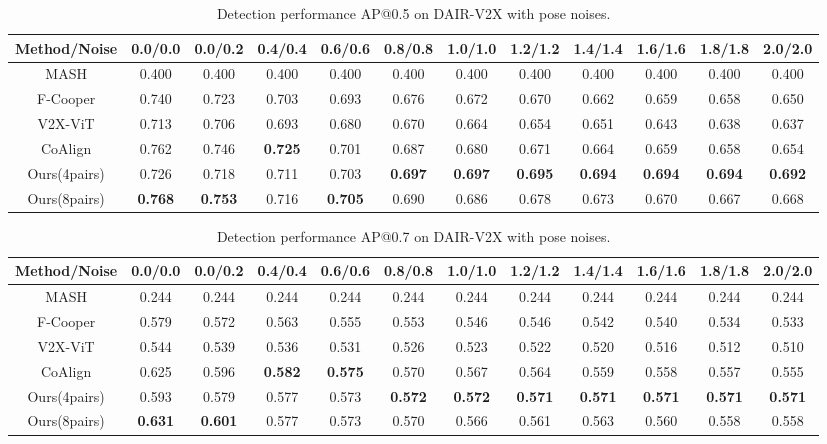     \begin{table*}
  \caption{Detection performance AP@0.5 on DAIR-V2X with pose noises.}
  \label{table1}
  \begin{tabular}{c|ccccccccccc}
    \toprule
    Method/Noise & 0.0/0.0 & 0.0/0.2 & 0.4/0.4 & 0.6/0.6 & 0.8/0.8 & 1.0/1.0 & 1.2/1.2 & 1.4/1.4 & 1.6/1.6 & 1.8/1.8 & 2.0/2.0 \\
    \midrule
    MASH \cite{MASH} & 0.400 & 0.400 & 0.400 & 0.400 & 0.400 & 0.400 & 0.400 & 0.400 & 0.400 & 0.400 & 0.400 \\
    F-Cooper \cite{F-Cooper}& 0.740 & 0.723 & 0.703 & 0.693 & 0.676 & 0.672 & 0.670 & 0.662 & 0.659 & 0.658 & 0.650 \\
    V2X-ViT \cite{v2xvit} & 0.713 & 0.706 & 0.693 & 0.680 & 0.670 & 0.664 & 0.654 & 0.651 & 0.643 & 0.638 & 0.637 \\
    CoAlign \cite{CoAlign} & 0.762 & 0.746 & \textbf{0.725} & 0.701 & 0.687 & 0.680 & 0.671 & 0.664 & 0.659 & 0.658 & 0.654 \\
    Ours(4pairs)   & 0.726 & 0.718 & 0.711 & 0.703 & \textbf{0.697} & \textbf{0.697} & \textbf{0.695} & \textbf{0.694} & \textbf{0.694} & \textbf{0.694} & \textbf{0.692} \\
    Ours(8pairs) & \textbf{0.768} & \textbf{0.753} & 0.716 & \textbf{0.705} & 0.690 & 0.686 & 0.678 & 0.673 & 0.670 & 0.667 & 0.668 \\
    \bottomrule
  \end{tabular}
\end{table*}


\begin{table*}
  \caption{Detection performance AP@0.7 on DAIR-V2X with pose noises.}
  \label{table2}
  \begin{tabular}{c|ccccccccccc}
    \toprule
    Method/Noise & 0.0/0.0 & 0.0/0.2 & 0.4/0.4 & 0.6/0.6 & 0.8/0.8 & 1.0/1.0 & 1.2/1.2 & 1.4/1.4 & 1.6/1.6 & 1.8/1.8 & 2.0/2.0 \\
    \midrule
    MASH \cite{MASH} & 0.244 & 0.244 & 0.244 & 0.244 & 0.244 & 0.244 & 0.244 & 0.244 & 0.244 & 0.244 & 0.244 \\
    F-Cooper \cite{F-Cooper}& 0.579 & 0.572 & 0.563 & 0.555 & 0.553 & 0.546 & 0.546 & 0.542 & 0.540 & 0.534 & 0.533 \\
    V2X-ViT \cite{v2xvit} & 0.544 & 0.539 & 0.536 & 0.531 & 0.526 & 0.523 & 0.522 & 0.520 & 0.516 & 0.512 & 0.510 \\
    CoAlign \cite{CoAlign} & 0.625 & 0.596 & \textbf{0.582} & \textbf{0.575} & 0.570 & 0.567 & 0.564 & 0.559 & 0.558 & 0.557 & 0.555 \\
    Ours(4pairs) & 0.593 & 0.579 & 0.577 & 0.573 & \textbf{0.572} & \textbf{0.572} & \textbf{0.571} & \textbf{0.571} & \textbf{0.571} & \textbf{0.571} & \textbf{0.571} \\
    Ours(8pairs) & \textbf{0.631} & \textbf{0.601} & 0.577 & 0.573 & 0.570 & 0.566 & 0.561 & 0.563 & 0.560 & 0.558 & 0.558 \\
    \bottomrule
  \end{tabular}
\end{table*}